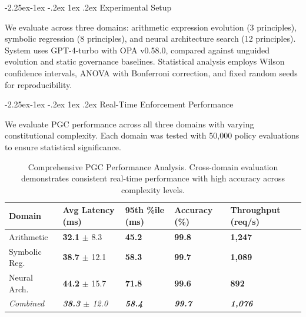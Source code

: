 \documentclass[manuscript,screen,review,anonymous,9pt]{acmart}
\makeatletter
\renewcommand\subsection{\@startsection{subsection}{2}{\z@}%
  {-2.25ex\@plus -1ex \@minus -.2ex}%
  {1ex \@plus .2ex}%
  {\normalfont\large\bfseries}}
\newcommand{\tablesize}{\tiny}
\newcommand{\tablenumfmt}[1]{\textbf{#1}}
\newcommand{\tableheader}[1]{\textbf{#1}}
\makeatother
\begin{document}
\subsection{Experimental Setup}
\label{subsec:experimental_setup}

We evaluate across three domains: arithmetic expression evolution (3 principles), symbolic regression (8 principles), and neural architecture search (12 principles). System uses GPT-4-turbo with OPA v0.58.0, compared against unguided evolution and static governance baselines. Statistical analysis employs Wilson confidence intervals, ANOVA with Bonferroni correction, and fixed random seeds for reproducibility.

\subsection{Real-Time Enforcement Performance}
\label{subsec:pgc_performance}

We evaluate PGC performance across all three domains with varying constitutional complexity. Each domain was tested with 50,000 policy evaluations to ensure statistical significance.

\begin{table}[htbp]
  \centering
  \caption{Comprehensive PGC Performance Analysis. Cross-domain evaluation demonstrates consistent real-time performance with high accuracy across complexity levels.}
  \label{tab:pgc_comprehensive}
  \tablesize
  \begin{tabular}{@{}l>{\centering\arraybackslash}p{1.4cm}>{\centering\arraybackslash}p{1.4cm}>{\centering\arraybackslash}p{1.2cm}>{\centering\arraybackslash}p{1.4cm}@{}}
    \toprule
    \tableheader{Domain} & \tableheader{Avg Latency (ms)} & \tableheader{95th \%ile (ms)} & \tableheader{Accuracy (\%)} & \tableheader{Throughput (req/s)} \\
    \midrule
    Arithmetic      & \tablenumfmt{32.1} $\pm$ 8.3    & \tablenumfmt{45.2}           & \tablenumfmt{99.8}          & \tablenumfmt{1,247}              \\
    Symbolic Reg.   & \tablenumfmt{38.7} $\pm$ 12.1   & \tablenumfmt{58.3}           & \tablenumfmt{99.7}          & \tablenumfmt{1,089}              \\
    Neural Arch.    & \tablenumfmt{44.2} $\pm$ 15.7   & \tablenumfmt{71.8}           & \tablenumfmt{99.6}          & \tablenumfmt{892}                \\
    \midrule
    \textit{Combined} & \textit{\tablenumfmt{38.3} $\pm$ 12.0} & \textit{\tablenumfmt{58.4}} & \textit{\tablenumfmt{99.7}} & \textit{\tablenumfmt{1,076}} \\
    \bottomrule
  \end{tabular}
\end{table}
\end{document}
